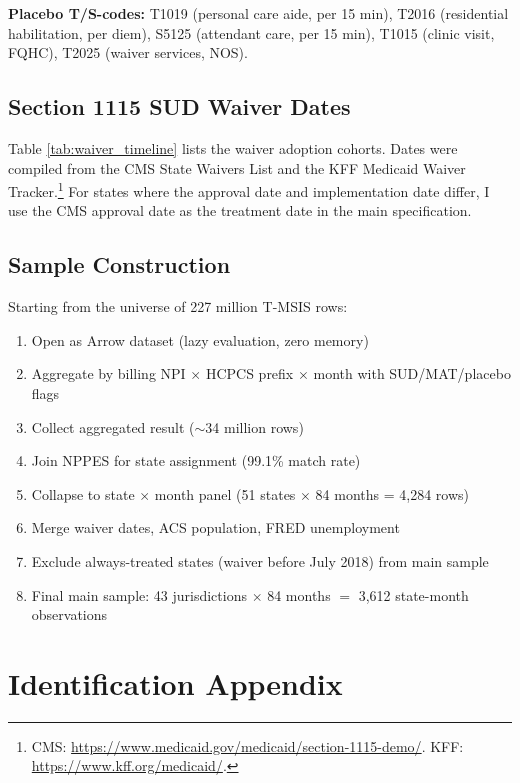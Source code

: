 \documentclass[12pt]{article}
\begin{document}
\textbf{Placebo T/S-codes:} T1019 (personal care aide, per 15 min), T2016 (residential habilitation, per diem), S5125 (attendant care, per 15 min), T1015 (clinic visit, FQHC), T2025 (waiver services, NOS).

\subsection{Section 1115 SUD Waiver Dates}



Table \ref{tab:waiver_timeline} lists the waiver adoption cohorts. Dates were compiled from the CMS State Waivers List and the KFF Medicaid Waiver Tracker.\footnote{CMS: \url{https://www.medicaid.gov/medicaid/section-1115-demo/}. KFF: \url{https://www.kff.org/medicaid/}.} For states where the approval date and implementation date differ, I use the CMS approval date as the treatment date in the main specification.

\subsection{Sample Construction}

Starting from the universe of 227 million T-MSIS rows:
\begin{enumerate}
    \item Open as Arrow dataset (lazy evaluation, zero memory)
    \item Aggregate by billing NPI $\times$ HCPCS prefix $\times$ month with SUD/MAT/placebo flags
    \item Collect aggregated result ($\sim$34 million rows)
    \item Join NPPES for state assignment (99.1\% match rate)
    \item Collapse to state $\times$ month panel (51 states $\times$ 84 months = 4,284 rows)
    \item Merge waiver dates, ACS population, FRED unemployment
    \item Exclude always-treated states (waiver before July 2018) from main sample
    \item Final main sample: 43 jurisdictions $\times$ 84 months $=$ 3,612 state-month observations
\end{enumerate}


\section{Identification Appendix}
\end{document}
